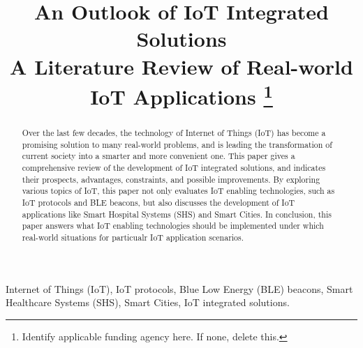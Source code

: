 \documentclass[conference]{IEEEtran}
\begin{document}
\title{An Outlook of IoT Integrated Solutions\\
{\footnotesize A Literature Review of Real-world IoT Applications}
\thanks{Identify applicable funding agency here. If none, delete this.}
}

\author{
\and
{}
}

\maketitle

\begin{abstract}
Over the last few decades, the technology of Internet of Things (IoT) has become a promising solution to many real-world problems, and is leading the transformation of current society into a smarter and more convenient one. This paper gives a comprehensive review of the development of IoT integrated solutions, and indicates their prospects, advantages, constraints, and possible improvements. By exploring various topics of IoT, this paper not only evaluates IoT enabling technologies, such as IoT protocols and BLE beacons, but also discusses the development of IoT applications like Smart Hospital Systems (SHS) and Smart Cities. In conclusion, this paper answers what IoT enabling technologies should be implemented under which real-world situations for particualr IoT application scenarios.\\
\end{abstract}

\begin{IEEEkeywords}
Internet of Things (IoT), IoT protocols, Blue Low Energy (BLE) beacons, Smart
Healthcare Systems (SHS), Smart Cities, IoT integrated solutions.
\end{IEEEkeywords}
\end{document}
